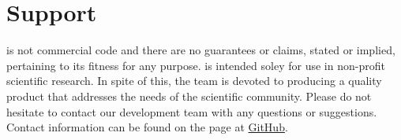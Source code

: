\section{Support}
\MMSP is not commercial code and there are no guarantees or claims, stated or implied, pertaining to its fitness for any purpose.  \MMSP is intended soley for use in non-profit scientific research.  In spite of this, the \MMSP team is devoted to producing a quality product that addresses the needs of the scientific community.  Please do not hesitate to contact our development team with any questions or suggestions.  Contact information can be found on the \MMSP page at \href{https://github.com/mesoscale}{GitHub}.

